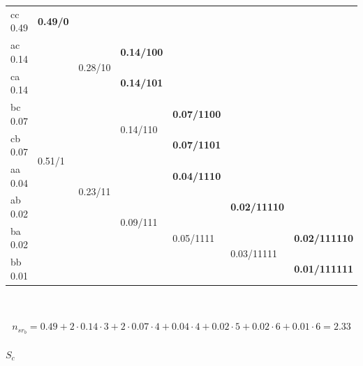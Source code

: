 \documentclass[12pt]{article}
\begin{document}
\begin{enumerate}
\begin{tabular}{|l|l|lllll}
\cline{1-2}
cc 0.49 & \textbf{0.49/0} &  &  &  &  &  \\ \cline{1-4}
ac 0.14 & \multirow{8}{*}{0.51/1} & \multicolumn{1}{l|}{\multirow{2}{*}{0.28/10}} & \multicolumn{1}{l|}{\textbf{0.14/100}} &  &  &  \\ \cline{1-1} \cline{4-4}
ca 0.14 &  & \multicolumn{1}{l|}{} & \multicolumn{1}{l|}{\textbf{0.14/101}} &  &  &  \\ \cline{1-1} \cline{3-5}
bc 0.07 &  & \multicolumn{1}{l|}{\multirow{6}{*}{0.23/11}} & \multicolumn{1}{l|}{\multirow{2}{*}{0.14/110}} & \multicolumn{1}{l|}{\textbf{0.07/1100}} &  &  \\ \cline{1-1} \cline{5-5}
cb 0.07 &  & \multicolumn{1}{l|}{} & \multicolumn{1}{l|}{} & \multicolumn{1}{l|}{\textbf{0.07/1101}} &  &  \\ \cline{1-1} \cline{4-5}
aa 0.04 &  & \multicolumn{1}{l|}{} & \multicolumn{1}{l|}{\multirow{4}{*}{0.09/111}} & \multicolumn{1}{l|}{\textbf{0.04/1110}} &  &  \\ \cline{1-1} \cline{5-6}
ab 0.02 &  & \multicolumn{1}{l|}{} & \multicolumn{1}{l|}{} & \multicolumn{1}{l|}{\multirow{3}{*}{0.05/1111}} & \multicolumn{1}{l|}{\textbf{0.02/11110}} &  \\ \cline{1-1} \cline{6-7} 
ba 0.02 &  & \multicolumn{1}{l|}{} & \multicolumn{1}{l|}{} & \multicolumn{1}{l|}{} & \multicolumn{1}{l|}{\multirow{2}{*}{0.03/11111}} & \multicolumn{1}{l|}{\textbf{0.02/111110}} \\ \cline{1-1} \cline{7-7} 
bb 0.01 &  & \multicolumn{1}{l|}{} & \multicolumn{1}{l|}{} & \multicolumn{1}{l|}{} & \multicolumn{1}{l|}{} & \multicolumn{1}{l|}{\textbf{0.01/111111}} \\ \hline
\end{tabular}
\\
\\
\begin{equation*}
    n_{sr_{b}} = 0.49 + 2\cdot0.14\cdot3 + 2\cdot0.07\cdot4 + 0.04\cdot4 + 0.02\cdot5 + 0.02\cdot6 + 0.01\cdot6 = 2.33
\end{equation*}	
\\
$S_c$
\\


\end{enumerate}
\end{document}
